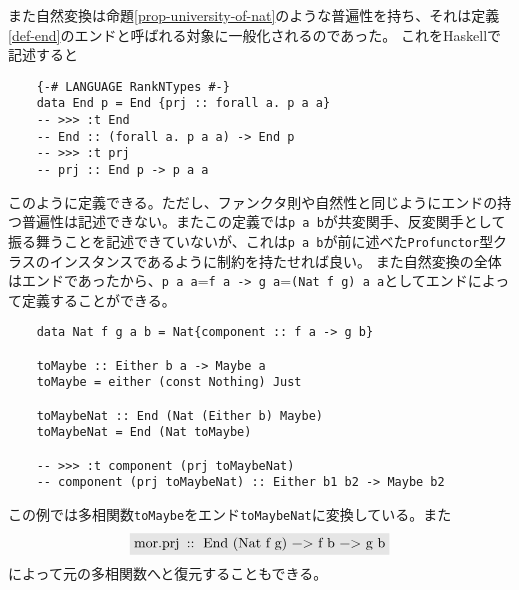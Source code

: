 \documentclass[uplatex,dvipdfmx]{jsarticle}
\newcommand{\pr}[1]{\colorbox[rgb]{0.9,0.9,0.9}{\lstinline{#1}}}
\newcommand{\refcti}[1]{\cite{cti}\ref{#1}}
\begin{document}
  また自然変換は命題\refcti{prop-university-of-nat}のような普遍性を持ち、それは定義\refcti{def-end}のエンドと呼ばれる対象に一般化されるのであった。
  これをHaskellで記述すると
  \begin{lstlisting}
    {-# LANGUAGE RankNTypes #-}
    data End p = End {prj :: forall a. p a a}
    -- >>> :t End
    -- End :: (forall a. p a a) -> End p
    -- >>> :t prj
    -- prj :: End p -> p a a
  \end{lstlisting}
  このように定義できる。ただし、ファンクタ則や自然性と同じようにエンドの持つ普遍性は記述できない。またこの定義では\pr{p a b}が共変関手、反変関手として振る舞うことを記述できていないが、これは\pr{p a b}が前に述べた\pr{Profunctor}型クラスのインスタンスであるように制約を持たせれば良い。
  また自然変換の全体はエンドであったから、\pr{p a a}=\pr{f a -> g a}=\pr{(Nat f g) a a}としてエンドによって定義することができる。
  \begin{lstlisting}
    data Nat f g a b = Nat{component :: f a -> g b}

    toMaybe :: Either b a -> Maybe a
    toMaybe = either (const Nothing) Just
    
    toMaybeNat :: End (Nat (Either b) Maybe)
    toMaybeNat = End (Nat toMaybe)
    
    -- >>> :t component (prj toMaybeNat)
    -- component (prj toMaybeNat) :: Either b1 b2 -> Maybe b2
  \end{lstlisting}
  この例では多相関数\pr{toMaybe}をエンド\pr{toMaybeNat}に変換している。また\[\pr{mor.prj :: End (Nat f g) -> f b -> g b}\]によって元の多相関数へと復元することもできる。
\end{document}
